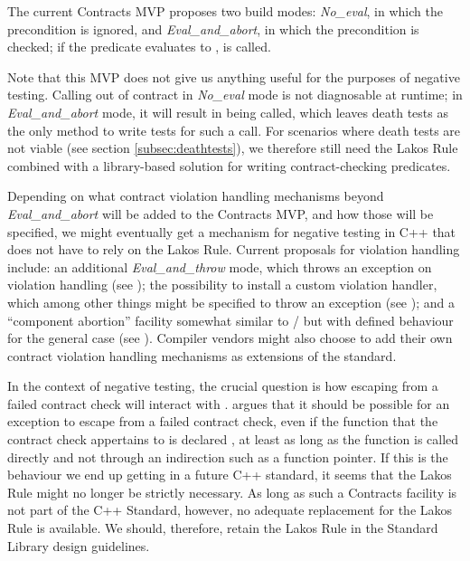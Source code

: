 The current Contracts MVP proposes two build modes: \emph{No_eval}, in which the precondition is ignored, and \emph{Eval_and_abort}, in which the precondition is checked; if the predicate evaluates to ,  is called.

Note that this MVP does not give us anything useful for the purposes of negative testing. Calling  out of contract in \emph{No_eval} mode is not diagnosable at runtime; in \mbox{\emph{Eval_and_abort}} mode, it will result in  being called, which leaves death tests as the only method to write tests for such a call. For scenarios where death tests are not viable (see section \ref{subsec:deathtests}), we therefore still need the Lakos Rule combined with a library-based solution for writing contract-checking predicates.

Depending on what contract violation handling mechanisms beyond \mbox{\emph{Eval_and_abort}} will be added to the Contracts MVP, and how those will be specified, we might eventually get a mechanism for negative testing in C++ that does not have to rely on the Lakos Rule. Current proposals for violation handling include: an additional \emph{Eval_and_throw} mode, which throws an exception on violation handling (see \cite{P2698R0}); the possibility to install a custom violation handler, which among other things might be specified to throw an exception (see \cite{P2811R1}); and a ``component abortion'' facility somewhat similar to / but with defined behaviour for the general case (see \cite{P2784R0}). Compiler vendors might also choose to add their own contract violation handling mechanisms as extensions of the standard.

In the context of negative testing, the crucial question is how escaping from a failed contract check will interact with . \cite{P2780R0} argues that it should be possible for an exception to escape from a failed contract check, even if the function that the contract check appertains to is declared , at least as long as the function is called directly and not through an indirection such as a function pointer. If this is the behaviour we end up getting in a future C++ standard, it seems that the Lakos Rule might no longer be strictly necessary. As long as such a Contracts facility is not part of the C++ Standard, however, no adequate replacement for the Lakos Rule is available. We should, therefore, retain the Lakos Rule in the Standard Library design guidelines.

